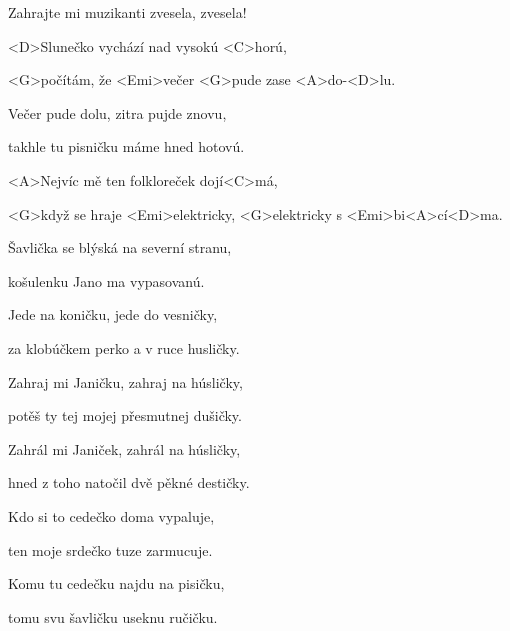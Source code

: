 

Zahrajte mi muzikanti zvesela, zvesela!

\zs
<D>Slunečko vychází nad vysokú <C>horú,

<G>počítám, že <Emi>večer <G>pude zase <A>do-<D>lu.

Večer pude dolu, zitra pujde znovu,

takhle tu pisničku máme hned hotovú.
\ks

\zr
<A>Nejvíc mě ten folkloreček {do}{jí}<C>má,

<G>když se hraje <Emi>elektricky, <G>elektricky s <Emi>bi<A>cí<D>ma.
\kr

\zs
Šavlička se blýská na severní stranu,

košulenku Jano ma vypasovanú.

Jede na koničku, jede do vesničky,

za klobúčkem perko a v ruce husličky.
\ks

\zr \kr

\zs
Zahraj mi Janičku, zahraj na húsličky,

potěš ty tej mojej přesmutnej dušičky.

Zahrál mi Janiček, zahrál na húsličky,

hned z toho natočil dvě pěkné destičky.

\ks

\zr \kr

\zs
Kdo si to cedečko doma vypaluje,

ten moje srdečko tuze zarmucuje.

Komu tu cedečku najdu na pisičku,

tomu svu šavličku useknu ručičku.
\ks

\zr \kr

\kp
